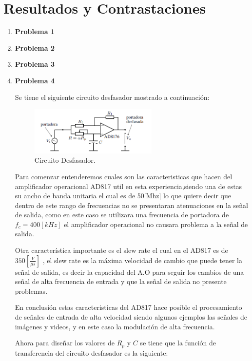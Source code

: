 \documentclass[letterpaper, titlepage]{article}
\begin{document}
\section{Resultados y Contrastaciones}
	\begin{enumerate}
		\item \textbf{Problema 1}
		
		\item \textbf{Problema 2}
		
		\item \textbf{Problema 3}
		
		\item \textbf{Problema 4}
		
		Se tiene el siguiente circuito desfasador mostrado a continuación:
		
\begin{figure}[H]
  \centering
    \includegraphics[width=0.6\textwidth]{circuitdesf}
  \caption{Circuito Desfasador.}
  \label{fig:ejemplo}
\end{figure}

		
Para comenzar entenderemos cuales son las caracteristicas que hacen del amplificador operacional AD817 util en esta experiencia,siendo una de estas su ancho de banda unitaria el cual es de 50[Mhz] lo que quiere decir que dentro de este rango de frecuencias no se presentaran atenuaciones en la señal de salida, como en este caso se utilizara una frecuencia de portadora de $f_{c} = 400[kHz]$ el amplificador operacional no causara problema a la señal de salida.

Otra característica importante es el slew rate el cual en el AD817 es de $350[\frac{V}{\mu s}]$ , el slew rate es la máxima velocidad de cambio que puede tener la señal de salida, es decir la capacidad del A.O para seguir los cambios de una señal de alta frecuencia de entrada y que la señal de salida no presente problemas.

En conclusión estas caracteristicas del AD817 hace posible el procesamiento de señales de entrada de alta velocidad siendo algunos ejemplos las señales de imágenes y videos, y en este caso la modulación de alta frecuencia.

Ahora para diseñar los valores de $ R_{p} $ y $C$ se tiene que la función de transferencia  del circuito desfasador es la siguiente:


\end{enumerate}
\end{document}
